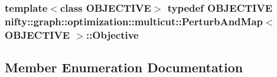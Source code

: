 \subsubsection[{Objective}]{\setlength{\rightskip}{0pt plus 5cm}template$<$class O\+B\+J\+E\+C\+T\+I\+V\+E$>$ typedef O\+B\+J\+E\+C\+T\+I\+V\+E {\bf nifty\+::graph\+::optimization\+::multicut\+::\+Perturb\+And\+Map}$<$ O\+B\+J\+E\+C\+T\+I\+V\+E $>$\+::{\bf Objective}}\label{classnifty_1_1graph_1_1optimization_1_1multicut_1_1PerturbAndMap_a2048cdfa7924f3638cbf678021514bdd}


\subsection{Member Enumeration Documentation}
\hypertarget{classnifty_1_1graph_1_1optimization_1_1multicut_1_1PerturbAndMap_a88d773cee3d185e28aecdc2c2707b744}{}

